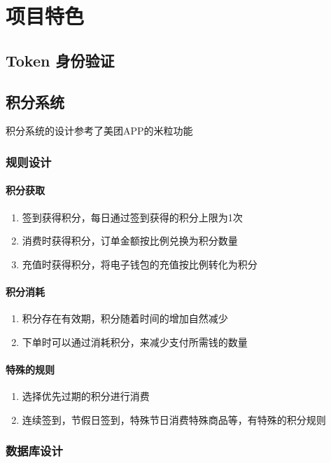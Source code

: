 \chapter{项目特色}

\section{Token 身份验证}

\section{积分系统}
积分系统的设计参考了美团APP的米粒功能
\subsection{规则设计}
\subsubsection{积分获取}
\begin{enumerate}
	\item 签到获得积分，每日通过签到获得的积分上限为1次
	\item 消费时获得积分，订单金额按比例兑换为积分数量
	\item 充值时获得积分，将电子钱包的充值按比例转化为积分
\end{enumerate}
\subsubsection{积分消耗}
\begin{enumerate}
	\item 积分存在有效期，积分随着时间的增加自然减少
	\item 下单时可以通过消耗积分，来减少支付所需钱的数量
\end{enumerate}
\subsubsection{特殊的规则}
\begin{enumerate}
	\item 选择优先过期的积分进行消费
	\item 连续签到，节假日签到，特殊节日消费特殊商品等，有特殊的积分规则
\end{enumerate}

\subsection{数据库设计}

